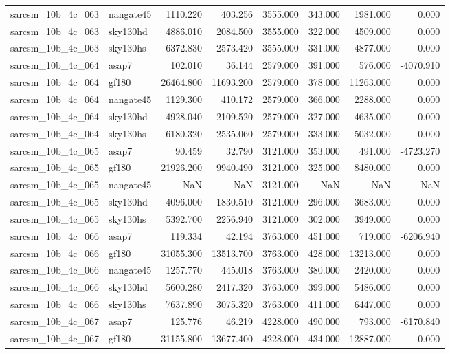 \begin{tabular}{llrrrrrr}
sarcsm\_10b\_4c\_063 & nangate45 & 1110.220 & 403.256 & 3555.000 & 343.000 & 1981.000 & 0.000 \\
sarcsm\_10b\_4c\_063 & sky130hd & 4886.010 & 2084.500 & 3555.000 & 322.000 & 4509.000 & 0.000 \\
sarcsm\_10b\_4c\_063 & sky130hs & 6372.830 & 2573.420 & 3555.000 & 331.000 & 4877.000 & 0.000 \\
sarcsm\_10b\_4c\_064 & asap7 & 102.010 & 36.144 & 2579.000 & 391.000 & 576.000 & -4070.910 \\
sarcsm\_10b\_4c\_064 & gf180 & 26464.800 & 11693.200 & 2579.000 & 378.000 & 11263.000 & 0.000 \\
sarcsm\_10b\_4c\_064 & nangate45 & 1129.300 & 410.172 & 2579.000 & 366.000 & 2288.000 & 0.000 \\
sarcsm\_10b\_4c\_064 & sky130hd & 4928.040 & 2109.520 & 2579.000 & 327.000 & 4635.000 & 0.000 \\
sarcsm\_10b\_4c\_064 & sky130hs & 6180.320 & 2535.060 & 2579.000 & 333.000 & 5032.000 & 0.000 \\
sarcsm\_10b\_4c\_065 & asap7 & 90.459 & 32.790 & 3121.000 & 353.000 & 491.000 & -4723.270 \\
sarcsm\_10b\_4c\_065 & gf180 & 21926.200 & 9940.490 & 3121.000 & 325.000 & 8480.000 & 0.000 \\
sarcsm\_10b\_4c\_065 & nangate45 & NaN & NaN & 3121.000 & NaN & NaN & NaN \\
sarcsm\_10b\_4c\_065 & sky130hd & 4096.000 & 1830.510 & 3121.000 & 296.000 & 3683.000 & 0.000 \\
sarcsm\_10b\_4c\_065 & sky130hs & 5392.700 & 2256.940 & 3121.000 & 302.000 & 3949.000 & 0.000 \\
sarcsm\_10b\_4c\_066 & asap7 & 119.334 & 42.194 & 3763.000 & 451.000 & 719.000 & -6206.940 \\
sarcsm\_10b\_4c\_066 & gf180 & 31055.300 & 13513.700 & 3763.000 & 428.000 & 13213.000 & 0.000 \\
sarcsm\_10b\_4c\_066 & nangate45 & 1257.770 & 445.018 & 3763.000 & 380.000 & 2420.000 & 0.000 \\
sarcsm\_10b\_4c\_066 & sky130hd & 5600.280 & 2417.320 & 3763.000 & 399.000 & 5486.000 & 0.000 \\
sarcsm\_10b\_4c\_066 & sky130hs & 7637.890 & 3075.320 & 3763.000 & 411.000 & 6447.000 & 0.000 \\
sarcsm\_10b\_4c\_067 & asap7 & 125.776 & 46.219 & 4228.000 & 490.000 & 793.000 & -6170.840 \\
sarcsm\_10b\_4c\_067 & gf180 & 31155.800 & 13677.400 & 4228.000 & 434.000 & 12887.000 & 0.000 \\

\end{tabular}
